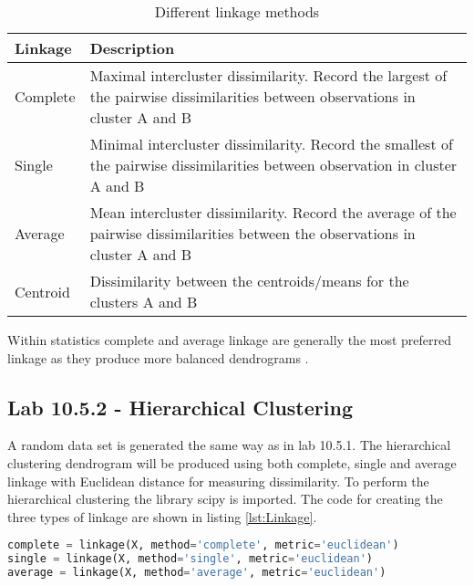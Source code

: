 \begin{table}
	\begin{center}
		\begin{tabular}{ | l | p{12cm} |}
			\hline
			Linkage & Description \\ \hline
			Complete & Maximal intercluster dissimilarity. Record the largest of the pairwise dissimilarities between observations in cluster A and B \\ \hline
			Single & Minimal intercluster dissimilarity. Record the smallest of the pairwise dissimilarities between observation in cluster A and B \\ \hline
			Average & Mean intercluster dissimilarity. Record the average of the pairwise dissimilarities between the observations in cluster A and B\\
			\hline
			Centroid & Dissimilarity between the centroids/means for the clusters A and B
			\\
			\hline
		\end{tabular}
	\end{center}
	\caption{Different linkage methods}
	\label{table:linkage}
\end{table}


Within statistics complete and average linkage are generally the most preferred linkage as they produce more balanced dendrograms \citep[pp. 394-395]{ISLR}. 


\subsection{Lab 10.5.2 - Hierarchical Clustering}
A random data set is generated the same way as in lab 10.5.1.
The hierarchical clustering dendrogram will be produced using both complete, single and average linkage with Euclidean distance for measuring dissimilarity.
To perform the hierarchical clustering the library scipy is imported.
The code for creating the three types of linkage are shown in listing \ref{lst:Linkage}.

\begin{lstlisting}[language=Python, label=lst:Linkage, caption=Applying the three different linkage styles on the data set]
complete = linkage(X, method='complete', metric='euclidean')
single = linkage(X, method='single', metric='euclidean') 
average = linkage(X, method='average', metric='euclidean')
\end{lstlisting}

